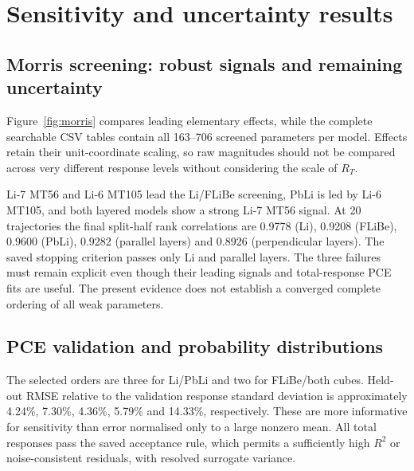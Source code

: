 \section{Sensitivity and uncertainty results}
\label{sec:results}
\subsection{Morris screening: robust signals and remaining uncertainty}
Figure~\ref{fig:morris} compares leading elementary effects, while the complete searchable CSV tables contain all 163--706 screened parameters per model. Effects retain their unit-coordinate scaling, so raw magnitudes should not be compared across very different response levels without considering the scale of $R_T$.


Li-7 MT56 and Li-6 MT105 lead the Li/FLiBe screening, PbLi is led by Li-6 MT105, and both layered models show a strong Li-7 MT56 signal. At 20 trajectories the final split-half rank correlations are 0.9778 (Li), 0.9208 (FLiBe), 0.9600 (PbLi), 0.9282 (parallel layers) and 0.8926 (perpendicular layers). The saved stopping criterion passes only Li and parallel layers. The three failures must remain explicit even though their leading signals and total-response PCE fits are useful. The present evidence does not establish a converged complete ordering of all weak parameters.

\subsection{PCE validation and probability distributions}
\begin{table}[tbp]\centering\small
\caption{Selected sparse-PCE fits for the total response. $d_a$ is the retained dimension; $p$ the selected order; $M$ the candidate hyperbolic basis size. The terms may have zero fitted coefficients after sparse pruning.}
\label{tab:validation}
\end{table}
The selected orders are three for Li/PbLi and two for FLiBe/both cubes. Held-out RMSE relative to the validation response standard deviation is approximately 4.24\%, 7.30\%, 4.36\%, 5.79\% and 14.33\%, respectively. These are more informative for sensitivity than error normalised only to a large nonzero mean. All total responses pass the saved acceptance rule, which permits a sufficiently high $R^2$ or noise-consistent residuals, with resolved surrogate variance.

